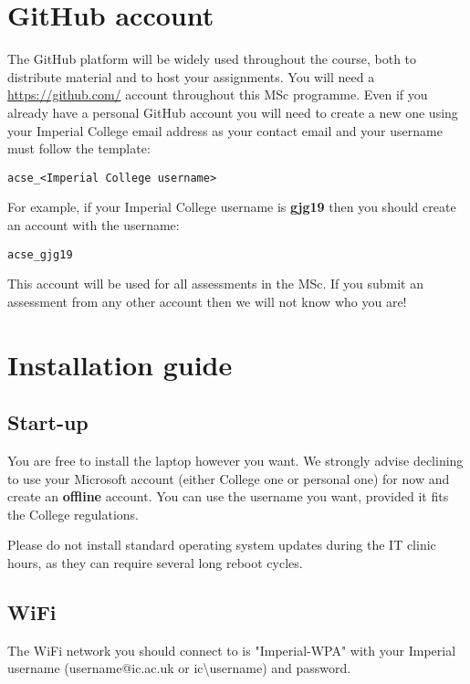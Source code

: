 \documentclass[11pt]{article}
\begin{document}
\section{GitHub account}

The GitHub platform will be widely used throughout the course, both to distribute material and to host your assignments. You will need a \url{https://github.com/} account throughout this MSc programme. Even if you already have a personal GitHub account you will need to create a new one using your Imperial College email address as your contact email and your username must follow the template:

\begin{verbatim}
acse_<Imperial College username>
\end{verbatim}

For example, if your Imperial College username is \textbf{gjg19} then you should create an account with the username:

\begin{verbatim}
acse_gjg19
\end{verbatim}

This account will be used for all assessments in the MSc. If you submit an assessment from any other account then we will not know who you are!


\section{Installation guide}

\subsection{Start-up}

You are free to install the laptop however you want. We strongly advise declining to use your Microsoft account (either College one or personal one) for now and create an {\bf offline} account. You can use the username you want, provided it fits the College regulations. 

Please do not install standard operating system updates during the IT clinic hours, as they can require several long reboot cycles.

\subsection{WiFi}
The WiFi network you should connect to is "Imperial-WPA" with your Imperial username (username@ic.ac.uk or ic{\textbackslash}username) and password.
\end{document}
